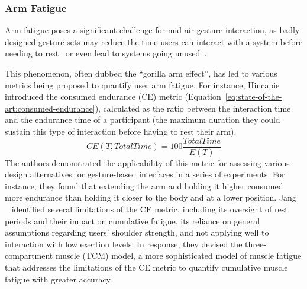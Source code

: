 \subsubsection{Arm Fatigue} \label{sec:state_of_the_art:overview:challenges:gorilla-arm}
Arm fatigue poses a significant challenge for mid-air gesture interaction, as badly designed gesture sets may reduce the time users can interact with a system before needing to rest~\cite{Hansberger:2017} or even lead to systems going unused~\cite{Siddhpuria:2017}. 

This phenomenon, often dubbed the ``gorilla arm effect'', has led to various metrics being proposed to quantify user arm fatigue. 
For instance, Hincapie \etal~\cite{Hincapie:2014} introduced the consumed endurance (CE) metric (Equation~\ref{eq:state-of-the-art:consumed-endurance}), calculated as the ratio between the interaction time and the endurance time of a participant (\ie the maximum duration they could sustain this type of interaction before having to rest their arm).
% 
\begin{equation}\label{eq:state-of-the-art:consumed-endurance}
    CE(T,TotalTime) = 100\frac{TotalTime}{E(T)}
\end{equation}
%
The authors demonstrated the applicability of this metric for assessing various design alternatives for gesture-based interfaces in a series of experiments.
For instance, they found that extending the arm and holding it higher consumed more endurance than holding it closer to the body and at a lower position. 
%
Jang \etal~\cite{Jang:2017} identified several limitations of the CE metric, including its oversight of rest periods and their impact on cumulative fatigue, its reliance on general assumptions regarding users' shoulder strength, and not applying well to interaction with low exertion levels. In response, they devised the three-compartment muscle (TCM) model, a more sophisticated model of muscle fatigue that addresses the limitations of the CE metric to quantify cumulative muscle fatigue with greater accuracy.

